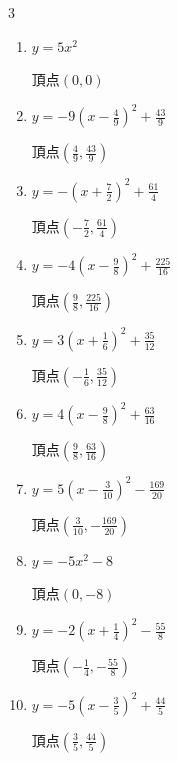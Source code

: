 \begin{multicols}{3}
\begin{enumerate}
  \item $\displaystyle y=5x^{2}$

        $\displaystyle 頂点\left( 0 , 0 \right)$

  \item $\displaystyle y=-9\left( x-\frac{4}{9}\right)^{2}+\frac{43}{9}$

        $\displaystyle 頂点\left( \frac{4}{9} , \frac{43}{9} \right)$

  \item $\displaystyle y=-\left( x+\frac{7}{2}\right)^{2}+\frac{61}{4}$

        $\displaystyle 頂点\left( -\frac{7}{2} , \frac{61}{4} \right)$

  \item $\displaystyle y=-4\left( x-\frac{9}{8}\right)^{2}+\frac{225}{16}$

        $\displaystyle 頂点\left( \frac{9}{8} , \frac{225}{16} \right)$

  \item $\displaystyle y=3\left( x+\frac{1}{6}\right)^{2}+\frac{35}{12}$

        $\displaystyle 頂点\left( -\frac{1}{6} , \frac{35}{12} \right)$

  \item $\displaystyle y=4\left( x-\frac{9}{8}\right)^{2}+\frac{63}{16}$

        $\displaystyle 頂点\left( \frac{9}{8} , \frac{63}{16} \right)$

  \item $\displaystyle y=5\left( x-\frac{3}{10}\right)^{2}-\frac{169}{20}$

        $\displaystyle 頂点\left( \frac{3}{10} , -\frac{169}{20} \right)$

\columnbreak %

  \item $\displaystyle y=-5x^{2}-8$

        $\displaystyle 頂点\left( 0 , -8 \right)$

  \item $\displaystyle y=-2\left( x+\frac{1}{4}\right)^{2}-\frac{55}{8}$

        $\displaystyle 頂点\left( -\frac{1}{4} , -\frac{55}{8} \right)$

  \item $\displaystyle y=-5\left( x-\frac{3}{5}\right)^{2}+\frac{44}{5}$

        $\displaystyle 頂点\left( \frac{3}{5} , \frac{44}{5} \right)$


\end{enumerate}
\end{multicols}
